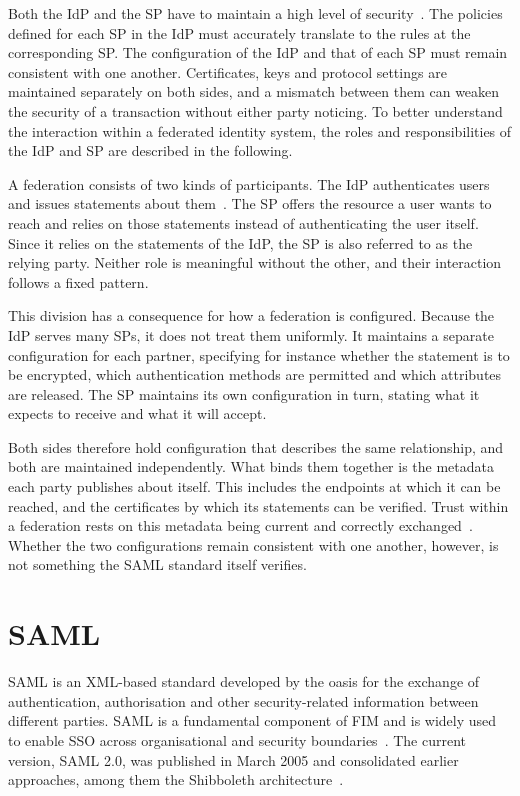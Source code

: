 \documentclass[../main.tex]{subfiles}
\begin{document}
Both the IdP and the SP have to maintain a high level of security~\cite{NIST80063C}. 
The policies defined for each SP in the IdP must accurately translate to the rules 
at the corresponding SP. 
The configuration of the IdP and that of each SP must remain consistent with one another. 
Certificates, keys and protocol settings are maintained separately on both sides, and a mismatch between 
them can weaken the security of a transaction without either party noticing.
To better understand the interaction within a federated identity system, the roles and responsibilities of 
the IdP and SP are described in the following.

A federation consists of two kinds of participants. 
The IdP authenticates users and issues statements about them~\cite{SAMLOverview}. 
The SP offers the resource a user wants to reach and relies on those statements instead of authenticating 
the user itself. 
Since it relies on the statements of the IdP, the SP is also referred to as the relying party. 
Neither role is meaningful without the other, and their interaction follows a fixed pattern. 

This division has a consequence for how a federation is configured. 
Because the IdP serves many SPs, it does not treat them uniformly. 
It maintains a separate configuration for each partner, specifying for instance whether the statement 
is to be encrypted, which authentication methods are permitted and which attributes are released. 
The SP maintains its own configuration in turn, stating what it expects to receive and what 
it will accept.

Both sides therefore hold configuration that describes the same relationship, and both are 
maintained independently. 
What binds them together is the metadata each party publishes about itself. 
This includes the endpoints at which it can be reached, and the certificates by which its statements can be verified. 
Trust within a federation rests on this metadata being current and correctly exchanged~\cite{SAMLMetadata}. 
Whether the two configurations remain consistent with one another, however, is not something the 
SAML standard itself verifies.

\section{SAML}\label{sec:saml}

SAML is an XML-based standard developed by the \gls{oasis} for the exchange of authentication, 
authorisation and other security-related information between different parties.
SAML is a fundamental component of FIM and is widely used to enable SSO across organisational and 
security boundaries~\cite{SAMLOverview}. 
The current version, SAML 2.0, was published in March 2005 and consolidated earlier approaches, 
among them the Shibboleth architecture~\cite{SAML2Standard}. 
\end{document}
